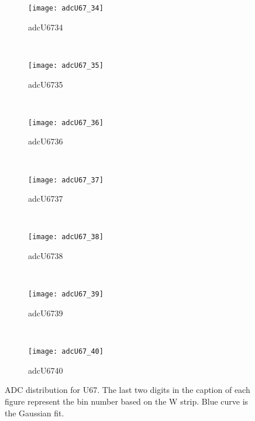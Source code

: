 \begin{figure}[h]
\begin{subfigure}[h]{0.3\textwidth}
        \centering
        \texttt{[image: adcU67\_34]}
        \caption{adcU6734}
        \label{fig:adcU67_34}
    \end{subfigure}
    \\
    \begin{subfigure}[h]{0.3\textwidth}
        \centering
        \texttt{[image: adcU67\_35]}
        \caption{adcU6735}
        \label{fig:adcU67_35}
    \end{subfigure}
    ~
    \begin{subfigure}[h]{0.3\textwidth}
        \centering
        \texttt{[image: adcU67\_36]}
        \caption{adcU6736}
        \label{fig:adcU67_36}
    \end{subfigure}
    ~
    \begin{subfigure}[h]{0.3\textwidth}
        \centering
        \texttt{[image: adcU67\_37]}
        \caption{adcU6737}
        \label{fig:adcU67_37}
    \end{subfigure}
    \\
    \begin{subfigure}[h]{0.3\textwidth}
        \centering
        \texttt{[image: adcU67\_38]}
        \caption{adcU6738}
        \label{fig:adcU67_38}
    \end{subfigure}
    ~
    \begin{subfigure}[h]{0.3\textwidth}
        \centering
        \texttt{[image: adcU67\_39]}
        \caption{adcU6739}
        \label{fig:adcU67_39}
    \end{subfigure}
    ~
    \begin{subfigure}[h]{0.3\textwidth}
        \centering
        \texttt{[image: adcU67\_40]}
        \caption{adcU6740}
        \label{fig:adcU67_40}
    \end{subfigure}
    \caption{ADC distribution for U67. The last two digits in the caption of each figure represent the bin number based on the W strip.
    Blue curve is the Gaussian fit.}
    \label{fig:adcU3}
\end{figure}

